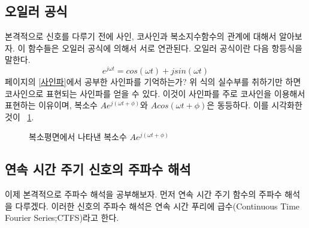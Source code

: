 \subsection{오일러 공식}
본격적으로 신호를 다루기 전에 사인, 코사인과 복소지수함수의 관계에 대해서 알아보자. 이 함수들은 오일러 공식에 의해서 서로 연관된다.
오일러 공식이란 다음 항등식을 말한다.
\begin{equation}
    e^{j\omega t }=cos(\omega t)+jsin(\omega t)\label{eqn:Euler's formula}
\end{equation}
\pageref{사인파} 페이지의 \ref{사인파}에서 공부한 사인파를 기억하는가? 위 식의 실수부를 취하기만 하면 코사인으로 표현되는 사인파를 얻을 수 있다.
이것이 사인파를 주로 코사인을 이용해서 표현하는 이유이며, 복소수 $Ae^{j\left(\omega t+\phi\right)}$와 $Acos(\omega t+\phi)$은 동등하다.
이를 시각화한 것이 \figurename~\ref{fig:complex plane}.
\begin{figure}
    \centering
    \caption{복소평면에서 나타낸 복소수 $Ae^{j\left(\omega t+\phi\right)}$}\label{fig:complex plane}
\end{figure}

\subsection{연속 시간 주기 신호의 주파수 해석}\label{CTFS}
이제 본격적으로 주파수 해석을 공부해보자. 먼저 연속 시간 주기 함수의 주파수 해석을 다루겠다. 이러한 신호의 주파수 해석은 연속 시간 푸리에 급수(Continuous Time Fourier Series;CTFS)라고 한다.

